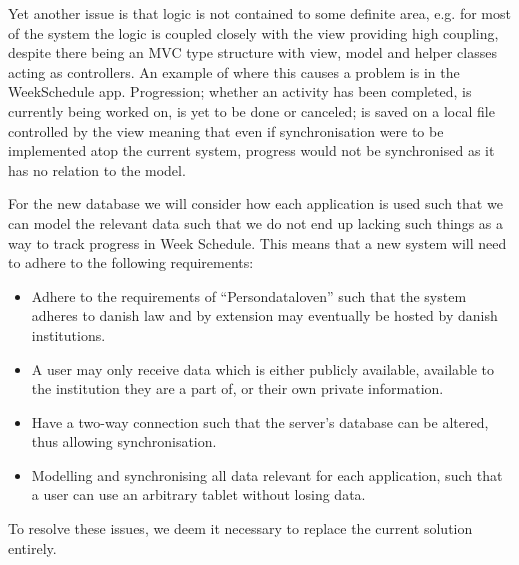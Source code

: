 Yet another issue is that logic is not contained to some definite area, e.g. for most of the system the logic is coupled closely with the view providing high coupling, despite there being an MVC type structure with view, model and helper classes acting as controllers.
An example of where this causes a problem is in the WeekSchedule app.
Progression; whether an activity has been completed, is currently being worked on, is yet to be done or canceled; is saved on a local file controlled by the view meaning that even if synchronisation were to be implemented atop the current system, progress would not be synchronised as it has no relation to the model.

For the new database we will consider how each application is used such that we can model the relevant data such that we do not end up lacking such things as a way to track progress in Week Schedule.
This means that a new system will need to adhere to the following requirements:
\begin{itemize}
	\item Adhere to the requirements of ``Persondataloven'' such that the system adheres to danish law and by extension may eventually be hosted by danish institutions.
	\item A user may only receive data which is either publicly available, available to the institution they are a part of, or their own private information.
	\item Have a two-way connection such that the server's database can be altered, thus allowing synchronisation.
	\item Modelling and synchronising all data relevant for each application, such that a user can use an arbitrary tablet without losing data.
\end{itemize}
To resolve these issues, we deem it necessary to replace the current solution entirely.
